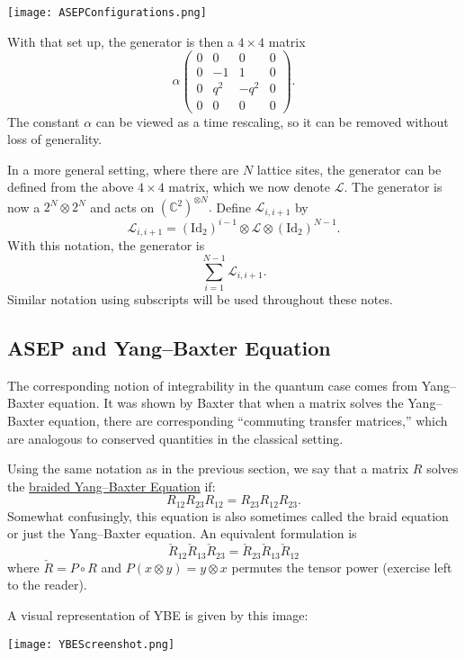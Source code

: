 \documentclass{ximera}
\begin{document}
\texttt{[image: ASEPConfigurations.png]}

With that set up, the generator is then a $4\times 4$ matrix
$$
\alpha\left(
    \begin{array}{cccc}
       0 & 0 & 0 & 0 \\
       0 & -1 & 1 & 0 \\
       0 & q^2 & -q^2 & 0 \\
       0 & 0 & 0 & 0 
    \end{array}
\right).
$$
The constant $\alpha$ can be viewed as a time rescaling, so it can be removed without loss of generality. 

In a more general setting, where there are $N$ lattice sites, the generator can be defined from the
above \(4\times 4\) matrix, which we now denote \(\mathcal{L}.\) The generator is now a \(2^N \otimes 2^N\) and
acts on  \((\mathbb{C}^2)^{\otimes N}.\) Define \(\mathcal{L}_{i,i+1}\) by 
\[
\mathcal{L}_{i,i+1} = (\mathrm{Id}_2)^{i-1} \otimes \mathcal{L} \otimes (\mathrm{Id}_2)^{N-1}.
\]
With this notation, the generator is
\[
\sum_{i=1}^{N-1} \mathcal{L}_{i,i+1}.
\]
Similar notation using subscripts will be used throughout these notes.

\subsection{ASEP and Yang--Baxter Equation}
The corresponding notion of integrability in the quantum case comes from Yang--Baxter equation. 
It was shown by Baxter that when a matrix solves the Yang--Baxter equation, there are corresponding
``commuting transfer matrices,'' which are analogous to conserved quantities in the classical setting. 



Using the same notation as in the previous section, 
we say that a matrix \(R\) solves the \underline{braided Yang--Baxter Equation} if:
\[
R_{12}R_{23}R_{12} = R_{23}R_{12}R_{23}.
\]
Somewhat confusingly, this equation is also sometimes called the braid equation or just the Yang--Baxter equation.
An equivalent formulation is
\[
\check{R}_{12}\check{R}_{13}\check{R}_{23} = \check{R}_{23}\check{R}_{13}\check{R}_{12}
\]
where $\check{R} = P \circ R$ and $P(x \otimes y) = y \otimes x$ permutes the tensor power
(exercise left to the reader). 

A visual representation of YBE is given by this image:

\texttt{[image: YBEScreenshot.png]}
\end{document}
